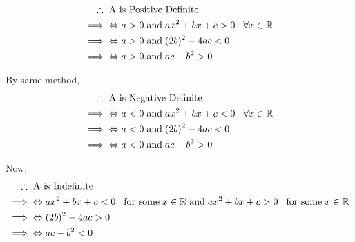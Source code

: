 \documentclass[Analysis-3]{subfiles}
\begin{document}
\begin{align*}
    \therefore \hspace{1mm} & \hspace{1mm} \text{A is Positive Definite} \\
    \implies & \Leftrightarrow a > 0 \hspace{1mm} \text{and} \hspace{1mm} ax^2 + bx+c > 0 \hspace{3mm} \forall x \in \mathbb{R} \\
    \implies & \Leftrightarrow a > 0 \hspace{1mm} \text{and} \hspace{1mm} (2b)^2 - 4ac < 0 \\
    \implies & \Leftrightarrow a > 0 \hspace{1mm} \text{and} \hspace{1mm} ac - b^2 > 0
\end{align*}

By same method, 
\begin{align*}
    \therefore \hspace{1mm} & \hspace{1mm} \text{A is Negative Definite} \\
    \implies & \Leftrightarrow a < 0 \hspace{1mm} \text{and} \hspace{1mm} ax^2 + bx+c < 0 \hspace{3mm} \forall x \in \mathbb{R} \\
    \implies & \Leftrightarrow a < 0 \hspace{1mm} \text{and} \hspace{1mm} (2b)^2 - 4ac < 0 \\
    \implies & \Leftrightarrow a < 0 \hspace{1mm} \text{and} \hspace{1mm} ac - b^2 > 0
\end{align*}

Now, 
\begin{align*}
    \therefore \hspace{1mm} & \hspace{1mm} \text{A is Indefinite} \\
    \implies & \Leftrightarrow ax^2 + bx+c < 0 \hspace{3mm} \text{for some} \hspace{1mm} x \in \mathbb{R} \hspace{1mm} \text{and} \hspace{1mm} ax^2 + bx+c > 0 \hspace{3mm} \text{for some} \hspace{1mm} x \in \mathbb{R} \\
    \implies & \Leftrightarrow (2b)^2 - 4ac > 0 \\
    \implies & \Leftrightarrow ac - b^2 < 0
\end{align*}
\end{document}
